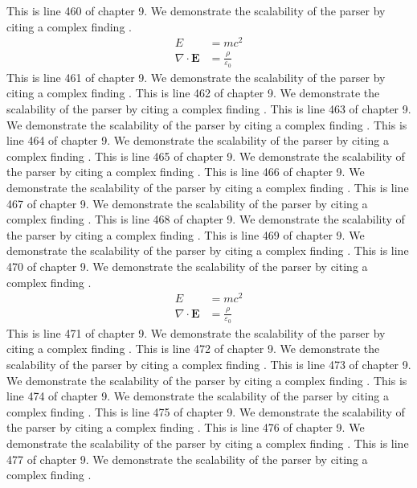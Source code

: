 This is line 460 of chapter 9. We demonstrate the scalability of the parser by citing a complex finding \cite{ref9_460}.
\begin{align*}
  E &= mc^2 \\
  \nabla \cdot \mathbf{E} &= \frac{\rho}{\varepsilon_0}
\end{align*}
This is line 461 of chapter 9. We demonstrate the scalability of the parser by citing a complex finding \cite{ref9_461}.
This is line 462 of chapter 9. We demonstrate the scalability of the parser by citing a complex finding \cite{ref9_462}.
This is line 463 of chapter 9. We demonstrate the scalability of the parser by citing a complex finding \cite{ref9_463}.
This is line 464 of chapter 9. We demonstrate the scalability of the parser by citing a complex finding \cite{ref9_464}.
This is line 465 of chapter 9. We demonstrate the scalability of the parser by citing a complex finding \cite{ref9_465}.
This is line 466 of chapter 9. We demonstrate the scalability of the parser by citing a complex finding \cite{ref9_466}.
This is line 467 of chapter 9. We demonstrate the scalability of the parser by citing a complex finding \cite{ref9_467}.
This is line 468 of chapter 9. We demonstrate the scalability of the parser by citing a complex finding \cite{ref9_468}.
This is line 469 of chapter 9. We demonstrate the scalability of the parser by citing a complex finding \cite{ref9_469}.
This is line 470 of chapter 9. We demonstrate the scalability of the parser by citing a complex finding \cite{ref9_470}.
\begin{align*}
  E &= mc^2 \\
  \nabla \cdot \mathbf{E} &= \frac{\rho}{\varepsilon_0}
\end{align*}
This is line 471 of chapter 9. We demonstrate the scalability of the parser by citing a complex finding \cite{ref9_471}.
This is line 472 of chapter 9. We demonstrate the scalability of the parser by citing a complex finding \cite{ref9_472}.
This is line 473 of chapter 9. We demonstrate the scalability of the parser by citing a complex finding \cite{ref9_473}.
This is line 474 of chapter 9. We demonstrate the scalability of the parser by citing a complex finding \cite{ref9_474}.
This is line 475 of chapter 9. We demonstrate the scalability of the parser by citing a complex finding \cite{ref9_475}.
This is line 476 of chapter 9. We demonstrate the scalability of the parser by citing a complex finding \cite{ref9_476}.
This is line 477 of chapter 9. We demonstrate the scalability of the parser by citing a complex finding \cite{ref9_477}.
